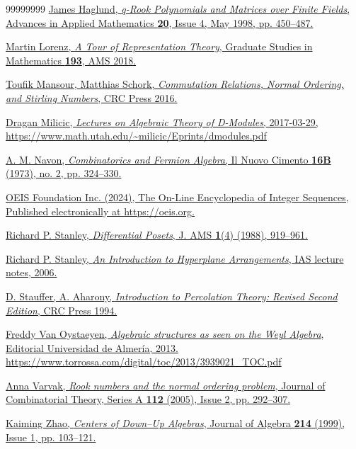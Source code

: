 \documentclass[numbers=enddot,12pt,final,onecolumn,notitlepage]{scrartcl}%
\theoremstyle{definition}
\begin{document}
\begin{thebibliography}{99999999}
\href{https://doi.org/10.1006/aama.1998.0582}{James Haglund, \textit{q-Rook Polynomials and Matrices over Finite Fields}, Advances in Applied Mathematics \textbf{20}, Issue 4, May 1998, pp. 450--487.}

\href{https://www.ams.org/books/gsm/193/}
{Martin Lorenz,
\textit{A Tour of Representation Theory},
Graduate Studies in Mathematics \textbf{193},
AMS 2018.}

\href{https://doi.org/10.1201/b18869}{Toufik Mansour, Matthias Schork, \textit{Commutation Relations, Normal Ordering, and
Stirling Numbers}, CRC Press 2016.}

\href{https://www.math.utah.edu/~milicic/Eprints/dmodules.pdf}{Dragan Milicic, \textit{Lectures on Algebraic Theory of D-Modules}, 2017-03-29,}
\url{https://www.math.utah.edu/~milicic/Eprints/dmodules.pdf}

\href{https://doi.org/10.1007/BF02828687}{A. M. Navon,
\textit{Combinatorics and Fermion Algebra},
Il Nuovo Cimento \textbf{16B} (1973), no. 2, pp. 324--330.}

\href{https://oeis.org}{OEIS Foundation Inc. (2024), The On-Line Encyclopedia of Integer Sequences, Published electronically at \url{https://oeis.org}.} 

\href{https://math.mit.edu/~rstan/pubs/pubfiles/77.pdf}{Richard P. Stanley, \emph{Differential Posets}, J. AMS \textbf{1}(4) (1988), 919--961.}

\href{https://math.mit.edu/~rstan/arrangements/arr.html}{Richard P. Stanley, \textit{An Introduction to Hyperplane
Arrangements}, IAS lecture notes, 2006.}

\href{https://doi.org/10.1201/9781315274386}
{D. Stauffer, A. Aharony, \textit{Introduction to Percolation Theory: Revised Second Edition}, CRC Press 1994.}

\href{https://www.torrossa.com/digital/toc/2013/3939021_TOC.pdf}{Freddy Van Oystaeyen,
\textit{Algebraic structures as seen on the Weyl Algebra},
Editorial Universidad de Almer\'ia, 2013.}
\url{https://www.torrossa.com/digital/toc/2013/3939021_TOC.pdf}

\href{https://doi.org/10.1016/j.jcta.2005.07.012}{Anna Varvak, \textit{Rook numbers and the normal ordering problem}, Journal of Combinatorial Theory, Series A \textbf{112} (2005), Issue 2, pp. 292--307.}

\href{https://doi.org/10.1006/jabr.1998.7695}{Kaiming Zhao, \textit{Centers of Down--Up Algebras},
Journal of Algebra \textbf{214} (1999), Issue 1, pp. 103--121.}
\end{thebibliography}
\end{document}
